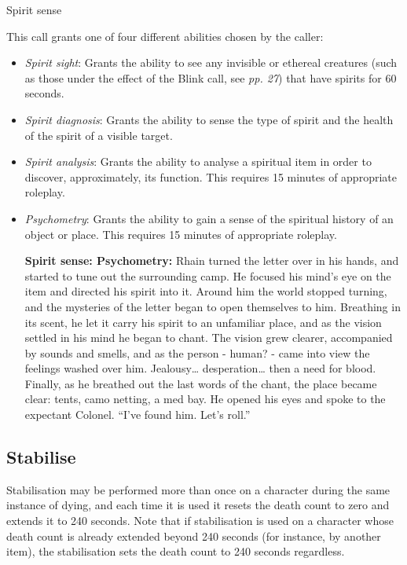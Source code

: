 Spirit sense

This call grants one of four different abilities chosen by the caller:

\begin{itemize}
\item \textit{Spirit sight}: Grants the ability to see any invisible or ethereal creatures (such as those under the effect of the Blink call, see \textit{pp. 27}) that have spirits for 60 seconds.

\item \textit{Spirit diagnosis}: Grants the ability to sense the type of spirit and the health of the spirit of a visible target.

\item \textit{Spirit analysis}: Grants the ability to analyse a spiritual item in order to discover, approximately, its function. This requires 15 minutes of appropriate roleplay.

\item \textit{Psychometry}: Grants the ability to gain a sense of the spiritual history of an object or place. This requires 15 minutes of appropriate roleplay.

\textbf{Spirit sense: Psychometry:} Rhain turned the letter over in his hands, and started to tune out the surrounding camp. He focused his mind's eye on the item and directed his spirit into it. Around him the world stopped turning, and the mysteries of the letter began to open themselves to him. Breathing in its scent, he let it carry his spirit to an unfamiliar place, and as the vision settled in his mind he began to chant. The vision grew clearer, accompanied by sounds and smells, and as the person - human? - came into view the feelings washed over him. Jealousy{\dots} desperation{\dots} then a need for blood. Finally, as he breathed out the last words of the chant, the place became clear: tents, camo netting, a med bay. He opened his eyes and spoke to the expectant Colonel. ``I've found him. Let's roll.''

\end{itemize}

\subsection{Stabilise}

Stabilisation may be performed more than once on a character during the same instance of dying, and each time it is used it resets the death count to zero and extends it to 240 seconds. Note that if stabilisation is used on a character whose death count is already extended beyond 240 seconds (for instance, by another item), the stabilisation sets the death count to 240 seconds regardless.


